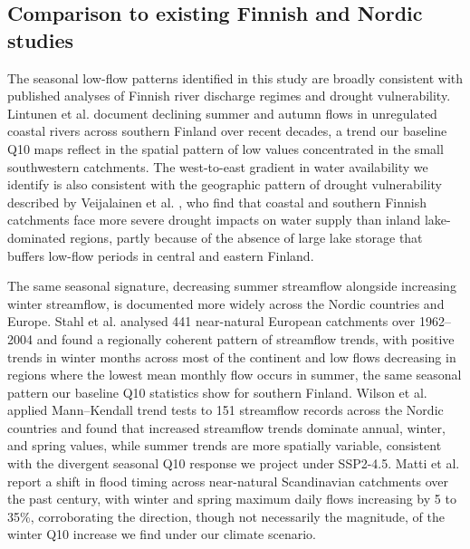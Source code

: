\documentclass[draft]{agujournal2019}
\begin{document}
\subsection{Comparison to existing Finnish and Nordic studies}
The seasonal low-flow patterns identified in this study are broadly consistent with published analyses of Finnish river discharge regimes and drought vulnerability. Lintunen et al.  document declining summer and autumn flows in unregulated coastal rivers across southern Finland over recent decades, a trend our baseline Q10 maps reflect in the spatial pattern of low values concentrated in the small southwestern catchments. The west-to-east gradient in water availability we identify is also consistent with the geographic pattern of drought vulnerability described by Veijalainen et al. , who find that coastal and southern Finnish catchments face more severe drought impacts on water supply than inland lake-dominated regions, partly because of the absence of large lake storage that buffers low-flow periods in central and eastern Finland.

The same seasonal signature, decreasing summer streamflow alongside increasing winter streamflow, is documented more widely across the Nordic countries and Europe. Stahl et al.  analysed 441 near-natural European catchments over 1962--2004 and found a regionally coherent pattern of streamflow trends, with positive trends in winter months across most of the continent and low flows decreasing in regions where the lowest mean monthly flow occurs in summer, the same seasonal pattern our baseline Q10 statistics show for southern Finland. Wilson et al.  applied Mann--Kendall trend tests to 151 streamflow records across the Nordic countries and found that increased streamflow trends dominate annual, winter, and spring values, while summer trends are more spatially variable, consistent with the divergent seasonal Q10 response we project under SSP2-4.5. Matti et al.  report a shift in flood timing across near-natural Scandinavian catchments over the past century, with winter and spring maximum daily flows increasing by 5 to 35\%, corroborating the direction, though not necessarily the magnitude, of the winter Q10 increase we find under our climate scenario.
\end{document}
